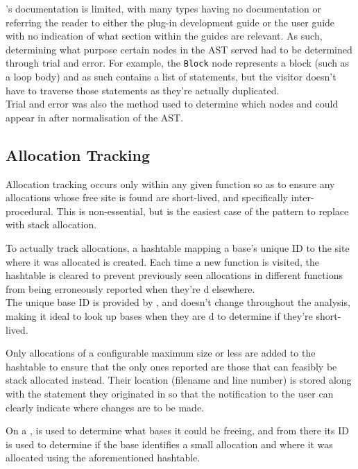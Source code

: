 's documentation is limited, with many types having no documentation or referring the reader to either the plug-in development guide or the user guide with no indication of what section within the guides are relevant. As such, determining what purpose certain nodes in the AST served had to be determined through trial and error. For example, the \texttt{Block} node represents a block (such as a loop body) and as such contains a list of statements, but the visitor doesn't have to traverse those statements as they're actually duplicated.\\
Trial and error was also the method used to determine which nodes \malloc{} and \free{} could appear in after normalisation of the AST.

\subsection{Allocation Tracking}

Allocation tracking occurs only within any given function so as to ensure any allocations whose free site is found are short-lived, and specifically inter-procedural. This is non-essential, but is the easiest case of the pattern to replace with stack allocation.

To actually track allocations, a hashtable mapping a base's unique ID to the site where it was allocated is created. Each time a new function is visited, the hashtable is cleared to prevent previously seen allocations in different functions from being erroneously reported when they're \free{}d elsewhere.\\
The unique base ID is provided by , and doesn't change throughout the analysis, making it ideal to look up bases when they are \free{}d to determine if they're short-lived.

Only allocations of a configurable maximum size or less are added to the hashtable to ensure that the only ones reported are those that can feasibly be stack allocated instead. Their location (filename and line number) is stored along with the statement they originated in so that the notification to the user can clearly indicate where changes are to be made.

On a \free{},  is used to determine what bases it could be freeing, and from there its ID is used to determine if the base identifies a small allocation and where it was allocated using the aforementioned hashtable.

